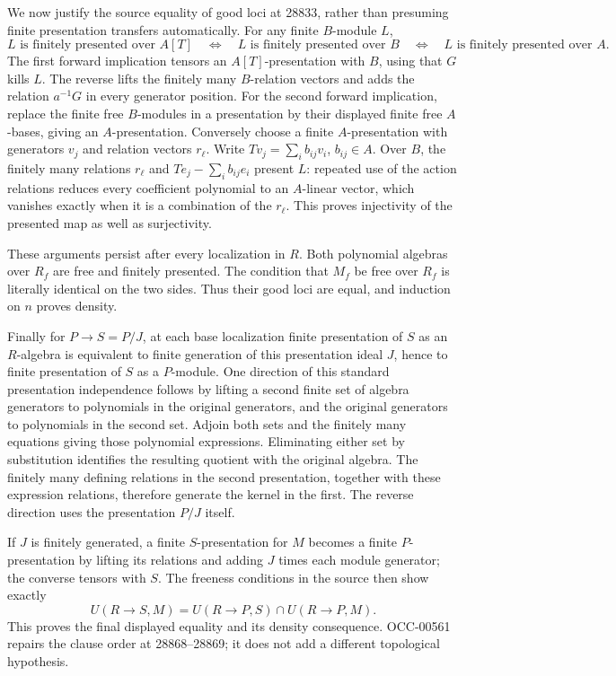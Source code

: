 We now justify the source equality of good loci at 28833, rather than presuming finite presentation transfers automatically. For any finite \(B\)-module \(L\), \[
 L\text{ is finitely presented over }A[T]
 \quad\Longleftrightarrow\quad
 L\text{ is finitely presented over }B
 \quad\Longleftrightarrow\quad
 L\text{ is finitely presented over }A.
\] The first forward implication tensors an \(A[T]\)-presentation with \(B\), using that \(G\) kills \(L\). The reverse lifts the finitely many \(B\)-relation vectors and adds the relation \(a^{-1}G\) in every generator position. For the second forward implication, replace the finite free \(B\)-modules in a presentation by their displayed finite free \(A\)-bases, giving an \(A\)-presentation. Conversely choose a finite \(A\)-presentation with generators \(v_j\) and relation vectors \(r_\ell\). Write \(Tv_j=\sum_i b_{ij}v_i\), \(b_{ij}\in A\). Over \(B\), the finitely many relations \(r_\ell\) and \(T e_j-\sum_i b_{ij}e_i\) present \(L\): repeated use of the action relations reduces every coefficient polynomial to an \(A\)-linear vector, which vanishes exactly when it is a combination of the \(r_\ell\). This proves injectivity of the presented map as well as surjectivity.

These arguments persist after every localization in \(R\). Both polynomial algebras over \(R_f\) are free and finitely presented. The condition that \(M_f\) be free over \(R_f\) is literally identical on the two sides. Thus their good loci are equal, and induction on \(n\) proves density.

Finally for \(P\to S=P/J\), at each base localization finite presentation of \(S\) as an \(R\)-algebra is equivalent to finite generation of this presentation ideal \(J\), hence to finite presentation of \(S\) as a \(P\)-module. One direction of this standard presentation independence follows by lifting a second finite set of algebra generators to polynomials in the original generators, and the original generators to polynomials in the second set. Adjoin both sets and the finitely many equations giving those polynomial expressions. Eliminating either set by substitution identifies the resulting quotient with the original algebra. The finitely many defining relations in the second presentation, together with these expression relations, therefore generate the kernel in the first. The reverse direction uses the presentation \(P/J\) itself.

If \(J\) is finitely generated, a finite \(S\)-presentation for \(M\) becomes a finite \(P\)-presentation by lifting its relations and adding \(J\) times each module generator; the converse tensors with \(S\). The freeness conditions in the source then show exactly \[
 U(R\to S,M)=U(R\to P,S)\cap U(R\to P,M).
\] This proves the final displayed equality and its density consequence. OCC-00561 repairs the clause order at 28868--28869; it does not add a different topological hypothesis.

